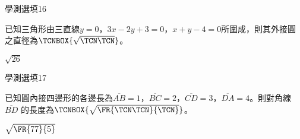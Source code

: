 \begin{QUESTIONS}
\begin{QUESTION}
\begin{QEMPTYSPACE}
        \end{QEMPTYSPACE}
    \end{QUESTION}
    \begin{QUESTION}
        \begin{ExamInfo}{86}{學測}{選填}{16}
        \end{ExamInfo}
        \begin{ExamAnsRateInfo}{}{}{}{}
        \end{ExamAnsRateInfo}
        \begin{QBODY}
            已知三角形由三直線$y=0$，$3x-2y+3=0$，$x+y-4=0$所圍成，則其外接圓之直徑為$\TCNBOX{\sqrt{\TCN\TCN}}$。
        \end{QBODY}
        \begin{QFROMS}
        \end{QFROMS}
        \begin{QTAGS}\end{QTAGS}
        \begin{QANS}
            $\sqrt{26}$
        \end{QANS}
        \begin{QSOLLIST}
        \end{QSOLLIST}
        \begin{QEMPTYSPACE}
        \end{QEMPTYSPACE}
    \end{QUESTION}
    \begin{QUESTION}
        \begin{ExamInfo}{86}{學測}{選填}{17}
        \end{ExamInfo}
        \begin{ExamAnsRateInfo}{}{}{}{}
        \end{ExamAnsRateInfo}
        \begin{QBODY}
            已知圓內接四邊形的各邊長為$\overline{AB}=1$，$\overline{BC}=2$，$\overline{CD}=3$，$\overline{DA}=4$。則對角線$\overline{BD}$ 的長度為$\TCNBOX{\sqrt{\FR{\TCN\TCN}{\TCN}}}$。
        \end{QBODY}
        \begin{QFROMS}
        \end{QFROMS}
        \begin{QTAGS}\end{QTAGS}
        \begin{QANS}
            $\sqrt{\FR{77}{5}}$
        \end{QANS}
        \begin{QSOLLIST}
        \end{QSOLLIST}

\end{QUESTION}
\end{QUESTIONS}
